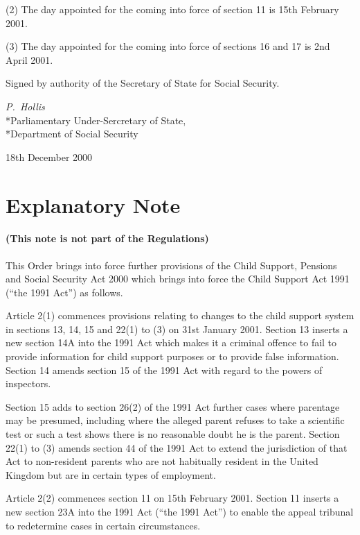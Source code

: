 \documentclass[12pt,a4paper]{article}
\begin{document}
(2) The day appointed for the coming into force of section 11 is 15th February 2001.

(3) The day appointed for the coming into force of sections 16 and 17 is 2nd April 2001. 

\bigskip

Signed 
by authority of the Secretary of State for Social Security.

{\raggedleft
\emph{P.~Hollis}\\*Parliamentary Under-Sercretary of State,\\*Department of Social Security

}

18th December 2000

\small

\part{Explanatory Note}

\renewcommand\parthead{--- Explanatory Note}

\subsection*{(This note is not part of the Regulations)}

This Order brings into force further provisions of the Child Support, Pensions and Social Security Act 2000 which brings into force the Child Support Act 1991 (“the 1991 Act”) as follows.

Article 2(1) commences provisions relating to changes to the child support system in sections 13, 14, 15 and 22(1) to (3) on 31st January 2001. Section 13 inserts a new section 14A into the 1991 Act which makes it a criminal offence to fail to provide information for child support purposes or to provide false information. Section 14 amends section 15 of the 1991 Act with regard to the powers of inspectors.

Section 15 adds to section 26(2) of the 1991 Act further cases where parentage may be presumed, including where the alleged parent refuses to take a scientific test or such a test shows there is no reasonable doubt he is the parent. Section 22(1) to (3) amends section 44 of the 1991 Act to extend the jurisdiction of that Act to non-resident parents who are not habitually resident in the United Kingdom but are in certain types of employment.

Article 2(2) commences section 11 on 15th February 2001. Section 11 inserts a new section 23A into the 1991 Act (“the 1991 Act”) to enable the appeal tribunal to redetermine cases in certain circumstances.
\end{document}
